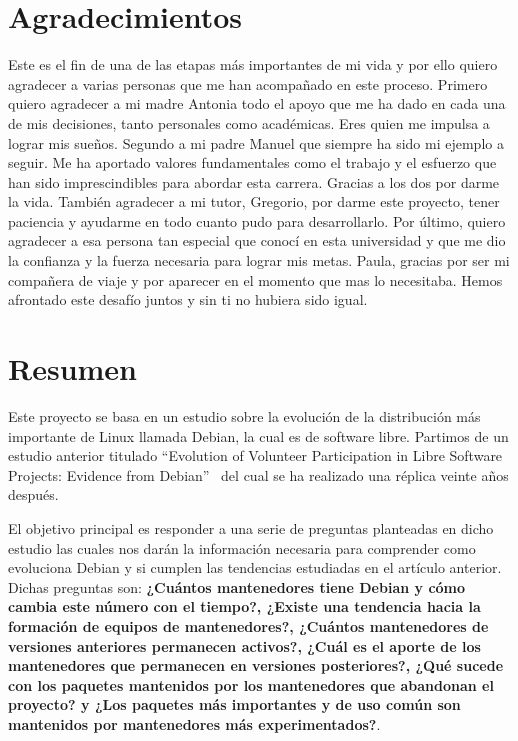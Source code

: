 \documentclass[a4paper, 12pt]{book}
\begin{document}
\chapter*{Agradecimientos}

Este es el fin de una de las etapas más importantes de mi vida y por ello quiero agradecer a varias personas que me han acompañado en este proceso.
Primero quiero agradecer a mi madre Antonia todo el apoyo que me ha dado en cada una de mis decisiones, tanto personales como académicas. Eres quien me impulsa a lograr mis sueños.
Segundo a mi padre Manuel que siempre ha sido mi ejemplo a seguir. Me ha aportado valores fundamentales como el trabajo y el esfuerzo que han sido imprescindibles para abordar esta carrera.
Gracias a los dos por darme la vida.
También agradecer a mi tutor, Gregorio, por darme este proyecto, tener paciencia  y ayudarme en todo cuanto pudo para desarrollarlo.
Por último, quiero agradecer a esa persona tan especial que conocí en esta universidad y que me dio la confianza y la fuerza necesaria para lograr mis metas. 
Paula, gracias por ser mi compañera de viaje y por aparecer en el momento que mas lo necesitaba. Hemos afrontado este desafío juntos y sin ti no hubiera sido igual.



\chapter*{Resumen}

Este proyecto se basa en un estudio sobre la evolución de la distribución más importante de Linux llamada Debian, la cual es de software libre. Partimos de un estudio anterior titulado ``Evolution of Volunteer Participation in Libre Software Projects: Evidence from Debian''~\cite{robles05:_debian} del cual se ha realizado una réplica veinte años después. 

El objetivo principal es responder a una serie de preguntas planteadas en dicho estudio las cuales nos darán la información necesaria para comprender como evoluciona Debian y si cumplen las tendencias estudiadas en el artículo anterior.
Dichas preguntas son: \textbf{¿Cuántos mantenedores tiene Debian y cómo cambia este número con el tiempo?, ¿Existe una tendencia hacia la formación de equipos de mantenedores?, ¿Cuántos mantenedores de versiones anteriores permanecen activos?, ¿Cuál es el aporte de los mantenedores que permanecen en versiones posteriores?, ¿Qué sucede con los paquetes mantenidos por los mantenedores que abandonan el proyecto? y ¿Los paquetes más importantes y de uso común son mantenidos por mantenedores más experimentados?}.
\end{document}
